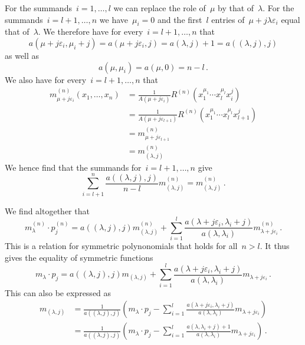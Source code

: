 \documentclass[a4paper,11pt]{scrartcl}
\begin{document}
For the summands~$i = 1, \dotsc, l$ we can replace the role of~$\mu$ by that of~$\lambda$.
For the summands~$i = l+1, \dotsc, n$ we have~$\mu_i = 0$ and the first~$l$ entries of~$\mu + j \lambda \varepsilon_i$ equal that of~$\lambda$.
We therefore have for every~$i = l+1, \dotsc, n$ that
\[
  a(\mu + j \varepsilon_i, \mu_i + j)
  =
  a(\mu + j \varepsilon_i, j)
  =
  a(\lambda, j) + 1
  =
  a((\lambda, j), j)
\]
as well as
\[
  a(\mu, \mu_i)
  =
  a(\mu, 0)
  =
  n - l \,.
\]
We also have for every~$i = l+1, \dotsc, n$ that
\begin{align*}
  m^{(n)}_{\mu + j \varepsilon_i}(x_1, \dotsc, x_n)
  &=
  \frac{1}{A(\mu + j \varepsilon_i)}
  R^{(n)}(x_1^{\mu_1} \dotsm x_l^{\mu_l} x_i^j)
  \\
  &=
  \frac{1}{A(\mu + j\varepsilon_{l+1})}
  R^{(n)}(x_1^{\mu_1} \dotsm x_l^{\mu_l} x_{l+1}^j)
  \\
  &=
  m^{(n)}_{\mu + j \varepsilon_{l+1}}
  \\
  &=
  m^{(n)}_{(\lambda, j)}
\end{align*}
We hence find that the summands for~$i = l+1, \dotsc, n$ give
\[
  \sum_{i=l+1}^n \frac{ a((\lambda, j), j) }{ n-l } m^{(n)}_{(\lambda, j)}
  =
  m^{(n)}_{(\lambda, j)} \,.
\]

We find altogether that
\[
  m^{(n)}_\lambda \cdot p^{(n)}_j
  =
  a((\lambda, j), j)
  m^{(n)}_{(\lambda, j)}
  +
  \sum_{i=1}^l
  \frac{ a(\lambda + j \varepsilon_i, \lambda_i + j) }{ a(\lambda, \lambda_i) } 
  m^{(n)}_{\lambda + j \varepsilon_i} \,.
\]
This is a relation for symmetric polynonomials that holds for all~$n > l$.
It thus gives the equality of symmetric functions
\[
  m_\lambda \cdot p_j
  =
  a((\lambda, j), j)
  m_{(\lambda, j)}
  +
  \sum_{i=1}^l
  \frac{ a(\lambda + j \varepsilon_i, \lambda_i + j) }{ a(\lambda, \lambda_i) } 
  m_{\lambda + j \varepsilon_i} \,.
\]
This can also be expressed as
\begin{align}
  m_{(\lambda, j)}
  &=
  \frac{1}{a((\lambda, j), j)}
  \left(
    m_\lambda \cdot p_j
    -
    \sum_{i=1}^l
    \frac{ a(\lambda + j \varepsilon_i, \lambda_i + j) }{ a(\lambda, \lambda_i) } 
    m_{\lambda + j \varepsilon_i}
  \right)
  \\
  &=
  \frac{1}{a((\lambda, j), j)}
  \left(
    m_\lambda \cdot p_j
    -
    \sum_{i=1}^l
    \frac{ a(\lambda, \lambda_i + j) + 1 }{ a(\lambda, \lambda_i) } 
    m_{\lambda + j \varepsilon_i}
  \right) \,.
\end{align}
\end{document}
